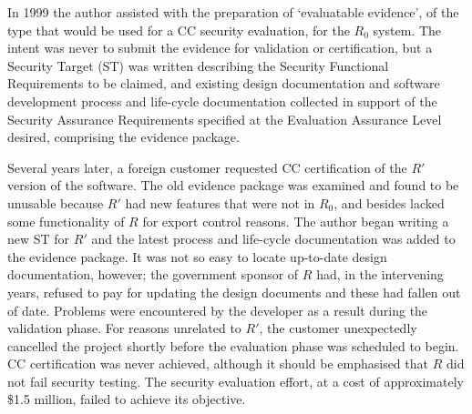 \documentclass[10pt,letterpaper,conference]{IEEEtran}
\begin{document}
In 1999 the author assisted with the preparation of `evaluatable evidence', of the type that would
be used for a CC security evaluation, for the $R_0$ system.  The intent was never to submit the
evidence for validation or certification, but a Security Target (ST) was written describing
the Security Functional Requirements to be claimed, and existing design documentation and software
development process and life-cycle documentation collected in support of the Security Assurance
Requirements specified at the Evaluation Assurance Level desired, comprising the evidence package.

Several years later, a foreign customer requested CC certification of the $R'$ version of the
software.  The old evidence package was examined and found to be unusable because $R'$ had new
features that were not in $R_0$, and besides lacked some functionality of $R$ for export control
reasons.  The author began writing a new ST for $R'$ and the latest process and life-cycle
documentation was added to the evidence package.  It was not so easy to locate up-to-date design
documentation, however; the government sponsor of $R$ had, in the intervening years, refused to
pay for updating the design documents and these had fallen out of date.  Problems were encountered
by the developer as a result during the validation phase.  For reasons unrelated to $R'$, the
customer unexpectedly cancelled the project shortly before the evaluation phase was scheduled to
begin.  CC certification was never achieved, although it should be emphasised that $R$ did not
fail security testing.  The security evaluation effort, at a cost of approximately \$1.5 million,
failed to achieve its objective.
\end{document}

